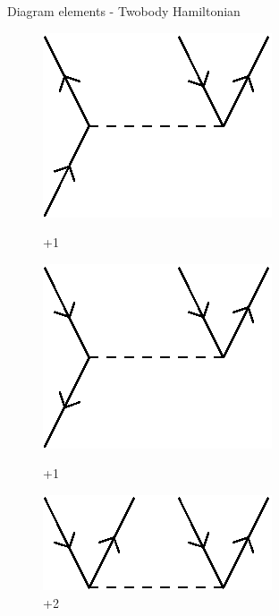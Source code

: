 \begin{frame}{Diagram elements - Twobody Hamiltonian}
    \begin{figure}
    \centering
    \parbox{0.30\textwidth}{
            \centering
            \includegraphics[scale=0.45]{graphics/v7}
            \caption{+1}
        }\quad
        \parbox{0.30\textwidth}{
            \centering
            \includegraphics[scale=0.45]{graphics/v8}
            \caption{+1}
        }\quad
        \parbox{0.30\textwidth}{
            \centering
            \includegraphics[scale=0.45]{graphics/v9}
            \caption{+2}
        }
    \end{figure}

\end{frame}

